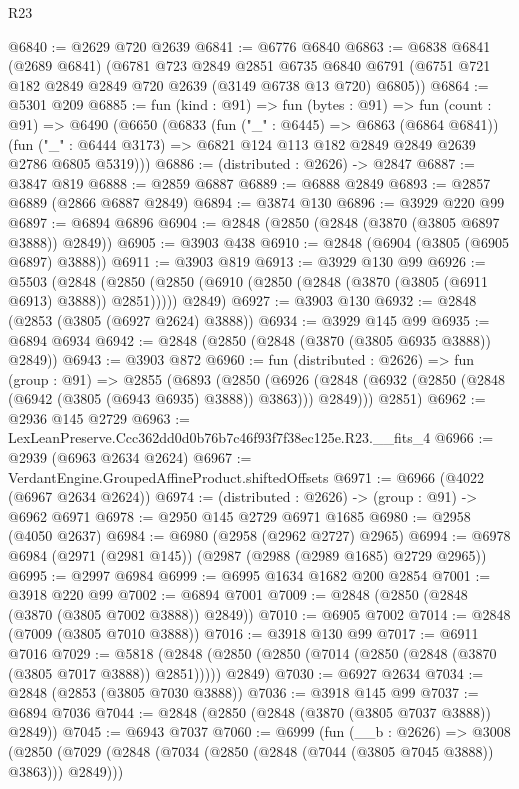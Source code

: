 \begin{lexlean}{R23}
\begin{coremodule}
@6840 := @2629 @720 @2639
@6841 := @6776 @6840
@6863 := @6838
    @6841
    (@2689 @6841)
    (@6781
      @723
      @2849
      @2851
      @6735
      @6840
      @6791
      (@6751 @721 @182 @2849 @2849 @720 @2639 (@3149 @6738 @13 @720) @6805))
@6864 := @5301 @209
@6885 := fun (kind : @91) =>
  fun (bytes : @91) =>
  fun (count : @91) =>
  @6490
    (@6650
      (@6833
        (fun ("_" : @6445) => @6863 (@6864 @6841))
        (fun ("_" : @6444 @3173) => @6821 @124 @113 @182 @2849 @2849 @2639 @2786 @6805 @5319)))
@6886 := (distributed : @2626) -> @2847
@6887 := @3847 @819
@6888 := @2859 @6887
@6889 := @6888 @2849
@6893 := @2857 @6889 (@2866 @6887 @2849)
@6894 := @3874 @130
@6896 := @3929 @220 @99
@6897 := @6894 @6896
@6904 := @2848 (@2850 (@2848 (@3870 (@3805 @6897 @3888)) @2849))
@6905 := @3903 @438
@6910 := @2848 (@6904 (@3805 (@6905 @6897) @3888))
@6911 := @3903 @819
@6913 := @3929 @130 @99
@6926 := @5503
    (@2848 (@2850 (@2850 (@6910 (@2850 (@2848 (@3870 (@3805 (@6911 @6913) @3888)) @2851))))) @2849)
@6927 := @3903 @130
@6932 := @2848 (@2853 (@3805 (@6927 @2624) @3888))
@6934 := @3929 @145 @99
@6935 := @6894 @6934
@6942 := @2848 (@2850 (@2848 (@3870 (@3805 @6935 @3888)) @2849))
@6943 := @3903 @872
@6960 := fun (distributed : @2626) =>
  fun (group : @91) =>
  @2855
    (@6893
      (@2850
        (@6926 (@2848 (@6932 (@2850 (@2848 (@6942 (@3805 (@6943 @6935) @3888)) @3863))) @2849)))
      @2851)
@6962 := @2936 @145 @2729
@6963 := LexLeanPreserve.Ccc362dd0d0b76b7c46f93f7f38ec125e.R23.__fits_4
@6966 := @2939 (@6963 @2634 @2624)
@6967 := VerdantEngine.GroupedAffineProduct.shiftedOffsets
@6971 := @6966 (@4022 (@6967 @2634 @2624))
@6974 := (distributed : @2626) -> (group : @91) -> @6962 @6971
@6978 := @2950 @145 @2729 @6971 @1685
@6980 := @2958 (@4050 @2637)
@6984 := @6980 (@2958 (@2962 @2727) @2965)
@6994 := @6978 @6984 (@2971 (@2981 @145)) (@2987 (@2988 (@2989 @1685) @2729 @2965))
@6995 := @2997 @6984
@6999 := @6995 @1634 @1682 @200 @2854
@7001 := @3918 @220 @99
@7002 := @6894 @7001
@7009 := @2848 (@2850 (@2848 (@3870 (@3805 @7002 @3888)) @2849))
@7010 := @6905 @7002
@7014 := @2848 (@7009 (@3805 @7010 @3888))
@7016 := @3918 @130 @99
@7017 := @6911 @7016
@7029 := @5818
    (@2848 (@2850 (@2850 (@7014 (@2850 (@2848 (@3870 (@3805 @7017 @3888)) @2851))))) @2849)
@7030 := @6927 @2634
@7034 := @2848 (@2853 (@3805 @7030 @3888))
@7036 := @3918 @145 @99
@7037 := @6894 @7036
@7044 := @2848 (@2850 (@2848 (@3870 (@3805 @7037 @3888)) @2849))
@7045 := @6943 @7037
@7060 := @6999
    (fun (__b : @2626) =>
    @3008
      (@2850 (@7029 (@2848 (@7034 (@2850 (@2848 (@7044 (@3805 @7045 @3888)) @3863))) @2849)))

\end{coremodule}
\end{lexlean}
